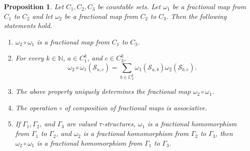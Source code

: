 \documentclass[nonacm]{acmart}
\newcommand{\N}{\mathbb N}
\newtheorem{proposition}[theorem]{Proposition}
\begin{document}
\begin{proposition}\label{prop:frac-comp}
Let $C_1, C_2, C_3$ be countable sets. Let $\omega_1$ be a fractional map from $C_1$ to $C_2$ and let $\omega_2$ be a fractional map from $C_2$ to $C_3$. Then the following statements hold.
\begin{enumerate}
    \item $\omega_2 \circ \omega_1$ is a fractional map from $C_1$ to $C_3$.
    \item For every $k \in \N$, $a \in C_1^k$, and $c \in C_3^k$, 
    \[\omega_2 \circ \omega_1 (\mathscr{S}_{a,c}) = \sum_{b \in C_2^k} \omega_1({\mathscr S}_{a,b}) \omega_2({\mathscr S}_{b,c}).\]
    \item The above property uniquely determines the fractional map $\omega_2 \circ \omega_1$.
    \item The operation $\circ$ of composition of fractional maps is associative.
    \item If $\Gamma_1, \Gamma_2$, and $\Gamma_3$ are valued $\tau$-structures, $\omega_1$ is a fractional homomorphism from $\Gamma_1$ to $\Gamma_2$, and $\omega_2$ is a fractional homomorphism from $\Gamma_2$ to $\Gamma_3$, then $\omega_2 \circ \omega_1$ is a fractional homomorphism from $\Gamma_1$ to $\Gamma_3$.
\end{enumerate} 
\end{proposition}
\end{document}
